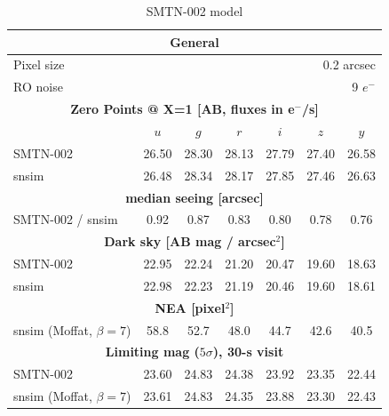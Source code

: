 \documentclass[\docopts]{\docclass}
\begin{document}
\begin{table}
\begin{center}
\caption{SMTN-002 model}
\label{tab:smtn002}
\begin{tabular}{l|cccccc}
\hline 
\hline 
\multicolumn{7}{c}{{\bf General}} \\
\hline
Pixel size & \multicolumn{6}{r}{0.2 arcsec} \\
RO noise   & \multicolumn{6}{r}{9 $e^-$}    \\
\hline
\multicolumn{7}{c}{{\bf Zero Points @ X=1 [AB, fluxes in e$^-$/s]}} \\
\hline
           &  $u$ & $g$ & $r$ & $i$ & $z$ & $y$ \\
SMTN-002   & 26.50 & 28.30 & 28.13 & 27.79 & 27.40 & 26.58 \\
snsim      & 26.48 & 28.34 & 28.17 & 27.85 & 27.46 & 26.63 \\
\hline
\multicolumn{7}{c}{{\bf median seeing [arcsec]}} \\
\hline
SMTN-002 / snsim  &  0.92 &  0.87 &  0.83 &  0.80 &  0.78 &  0.76 \\
\hline
\multicolumn{7}{c}{{\bf Dark sky [AB mag / arcsec$^2$]}}   \\
\hline
SMTN-002   & 22.95 & 22.24 & 21.20 & 20.47 & 19.60 & 18.63 \\ %
snsim      & 22.98 & 22.23 & 21.19 & 20.46 & 19.60 & 18.61 \\
\hline
\multicolumn{7}{c}{{\bf NEA [pixel$^2$]}}   \\
\hline
snsim (Moffat, $\beta=7$)     & 58.8  & 52.7  & 48.0  & 44.7  & 42.6  & 40.5  \\
\hline
\multicolumn{7}{c}{{\bf Limiting mag ($5 \sigma$), 30-s visit}}   \\
\hline
SMTN-002                    &  23.60     &  24.83     &  24.38     &   23.92    &  23.35     &  22.44  \\
snsim (Moffat, $\beta=7$)   &  23.61     &  24.83     &  24.35     &   23.88    &  23.30     &  22.43  \\
\hline
\end{tabular}
\end{center}
\end{table}
\end{document}
